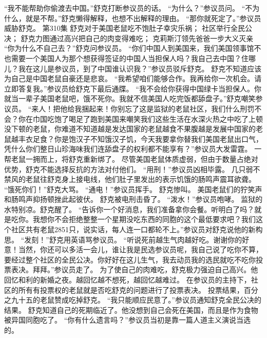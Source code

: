 \documentclass[a4paper,12pt,UTF8,twoside]{ctexbook}
\begin{document}
        “我不能帮助你偷渡去中国。”舒克打断参议员的话。  
        “为什么？”参议员问。  
        “不为什么，就是不帮。”舒克懒得解释，也想不出解释的理由。  
        “那你就死定了。”参议员威胁舒克。          第310集  
        舒克对于美国老鼠吃不饱肚子幸灾乐祸；  
        社区举行全民公决；  
        舒克力图通过高兴把自己的肉变得难吃；  
        克莉斯汀领先爸爸一步大义灭亲    
        “你为什么不自己去？”舒克问参议员。  
        “你们中国人到美国来，我们美国领事馆不也需要一个美国人为那个想获得签证的中国人当担保人吗？我自己去中国？住哪儿？我在这儿是参议员，到了中国谁认识我？”参议员驳斥舒克。  
        舒克不知道应该为自己是中国老鼠自豪还是悲哀。  
        “我希望咱们能够合作。我再给你一次机会。请立即答复我。”参议员给舒克下最后通牒。        
        “我不会给你获得中国绿卡当担保人。你就当一辈子美国老鼠吧，饿不死你。我就不信美国人吃完饭都舔盘子。”舒克嘲笑参议员。  
        “来人！把他给我捆起来！你别忘了这是监狱的老鼠社区，我们什么刑罚不会？你在巾国吃饱了喝足了跑到美国来嘲笑我们这些生活在水深火热之中吃了上顿没下顿的老鼠，你难道不知道越是发达国家的老鼠越食不果腹越是发展中国家的老鼠越丰衣足食？你是饱汉子不知饿汉子饥，今天我要拿你替我们美国老鼠出口气，凭什么你们整日山珍海味我们连舔盘子的权利都不能享有？”参议员大发雷霆。  
        一帮老鼠一拥而上，将舒克重新绑了。  
        尽管美国老鼠体质虚弱，但由于数量占绝对优势，舒克不能选择反抗的方法对付他们。  
        “用刑！”参议员凶相毕露。  
        几只弱不禁风的老鼠往舒克身上接电线，他们肚子里发出的表示饥饿的肠鸣声震耳欲聋。  
        “饿死你们！”舒克大骂。  
        “通电！”参议员挥手。  
        舒克惨叫。  
        美国老鼠们的狞笑声和肠鸣声抑扬顿挫此起彼伏。  
        舒克被电刑击昏了。  
        “泼水！”参议员咆哮。        
        监狱的水特别凉。舒克醒了。  
        “告诉你一个好消息，我们准备拿你会餐。听明白了吗？就是吃你。我想你不会拒绝整整一个星期没吃东西的同胞的这个最低要求吧？我们这个社区共有老鼠2851只，说实话，每人连一口都轮不上。”参议员对舒克说他的新构思。  
        “发刻！”舒克用英语骂参议员。  
        “听说死前越生气肉越好吃。谢谢你的好意！当然，你还可以多活一会儿，谁让我是民选参议员呢，我自己说了吃你不算，要经过整个社区的全民公决。你好好在这儿生气，我去动员我的选民就吃不吃你投票表决。拜拜。”参议员走了。  
        为了使自己的肉难吃，舒克极力强迫自己高兴。他回忆和利的新婚之夜。越回忆越不想死，越回忆越难过。  
        在参议员的主持下，社区的所有有投票权的老鼠就是否吃舒克的问题进行了投票表决。  
        投票结果，百分之九十五的老鼠赞成吃掉舒克。  
        “我只能顺应民意了。”参议员通知舒克全民公决的结果。  
        舒克知道自己的死期临近了。他没想到自己会死在美国，而且是作为食物被异国同胞吃了。  
        “你有什么遗言吗？”参议员当初是靠一篇人道主义演说当选的。        
\end{document}
